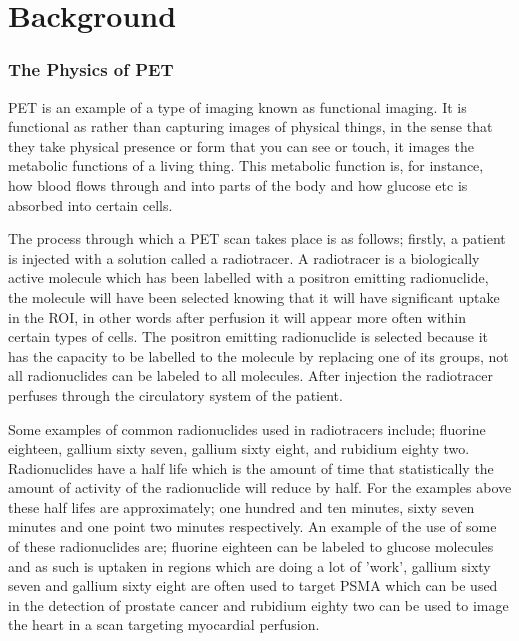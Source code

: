 \chapter{Background} \label{background}
    \blindtext
    
        \blindtext
        
        \subsection{The Physics of PET} \label{the_physics_of_pet}
            \gls{PET} is an example of a type of imaging known as functional imaging. It is functional as rather than capturing images of physical things, in the sense that they take physical presence or form that you can see or touch, it images the metabolic functions of a living thing. This metabolic function is, for instance, how blood flows through and into parts of the body and how glucose etc is absorbed into certain cells.
            
            The process through which a \gls{PET} scan takes place is as follows; firstly, a patient is injected with a solution called a radiotracer. A radiotracer is a biologically active molecule which has been labelled with a positron emitting radionuclide, the molecule will have been selected knowing that it will have significant uptake in the \gls{ROI}, in other words after perfusion it will appear more often within certain types of cells. The positron emitting radionuclide is selected because it has the capacity to be labelled to the molecule by replacing one of its groups, not all radionuclides can be labeled to all molecules. After injection the radiotracer perfuses through the circulatory system of the patient.
            
            Some examples of common radionuclides used in radiotracers include; fluorine eighteen, gallium sixty seven, gallium sixty eight, and rubidium eighty two. Radionuclides have a half life which is the amount of time that statistically the amount of activity of the radionuclide will reduce by half. For the examples above these half lifes are approximately; one hundred and ten minutes, sixty seven minutes and one point two minutes respectively. An example of the use of some of these radionuclides are; fluorine eighteen can be labeled to glucose molecules and as such is uptaken in regions which are doing a lot of 'work', gallium sixty seven and gallium sixty eight are often used to target \gls{PSMA} which can be used in the detection of prostate cancer and rubidium eighty two can be used to image the heart in a scan targeting myocardial perfusion.
            
